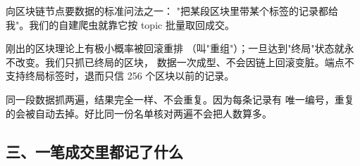 \begin{description}[style=nextline, leftmargin=1em]
\item[取数命令 \code{eth\_getLogs}] 向区块链节点要数据的标准问法之一：
  "把某段区块里带某个标签的记录都给我"。我们的自建爬虫就靠它按 topic
  批量取回成交。

\item[终局 finalized、区块重组] 刚出的区块理论上有极小概率被回滚重排
  （叫"重组"）；一旦达到"终局"状态就永不改变。我们只抓已终局的区块，
  数据一次成型、不会因链上回滚变脏。端点不支持终局标签时，退而只信
  256 个区块以前的记录。

\item[幂等] 同一段数据抓两遍，结果完全一样、不会重复。因为每条记录有
  唯一编号，重复的会被自动去掉。好比同一份名单核对两遍不会把人数算多。
\end{description}

\subsection{三、一笔成交里都记了什么}
